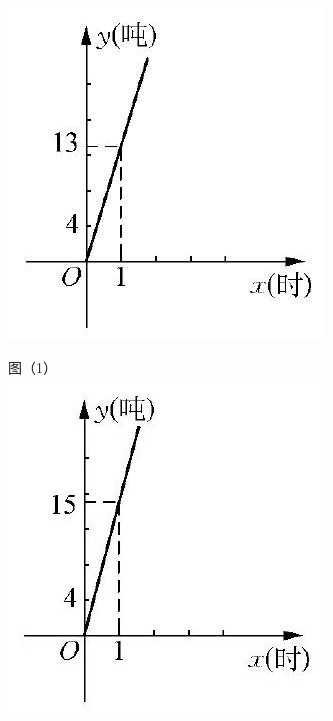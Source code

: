 \documentclass[10pt]{article}
\begin{document}
\includegraphics[max width=\textwidth, center]{2024_10_30_1bf34f7aeb61f11d11d3g-105}

图（1）\\
\includegraphics[max width=\textwidth, center]{2024_10_30_1bf34f7aeb61f11d11d3g-105(1)}
\end{document}
